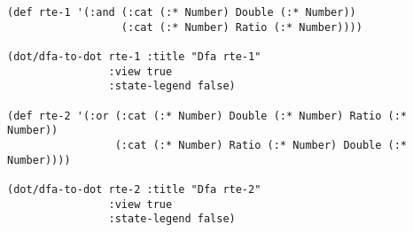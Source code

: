 \begin{lstlisting}[style=reclojureClojure,frame=single]
(def rte-1 '(:and (:cat (:* Number) Double (:* Number))
                  (:cat (:* Number) Ratio (:* Number))))

(dot/dfa-to-dot rte-1 :title "Dfa rte-1"
                :view true
                :state-legend false)

(def rte-2 '(:or (:cat (:* Number) Double (:* Number) Ratio (:* Number))
                 (:cat (:* Number) Ratio (:* Number) Double (:* Number))))

(dot/dfa-to-dot rte-2 :title "Dfa rte-2" 
                :view true
                :state-legend false)
\end{lstlisting}
